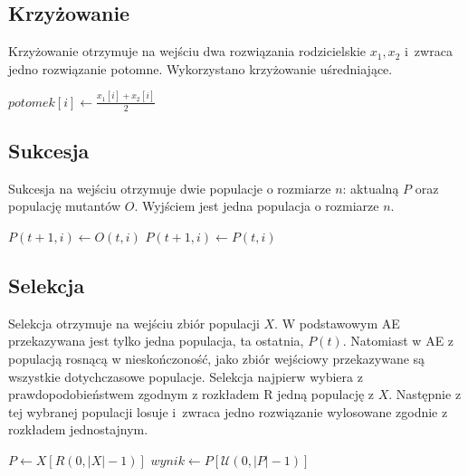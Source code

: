\documentclass[12pt, a4paper]{article}
\begin{document}
\subsection{Krzyżowanie}

Krzyżowanie otrzymuje na wejściu dwa rozwiązania rodzicielskie $x_1,x_2$ i~zwraca jedno rozwiązanie potomne. 
Wykorzystano krzyżowanie uśredniające.

\begin{algorithm}[!htb]
\begin{algorithmic}[1]
    \State $potomek[i] \gets \frac{x_1[i] + x_2[i]}{2}$
  \EndFor
\EndFunction
\end{algorithmic}
\end{algorithm}

\subsection{Sukcesja}

Sukcesja na wejściu otrzymuje dwie populacje o rozmiarze $n$: aktualną $P$ oraz populację mutantów $O$.
Wyjściem jest jedna populacja o rozmiarze $n$.

\begin{algorithm}[!htb]
\begin{algorithmic}[1]
      \State $P(t+1, i) \gets O(t, i)$
    \Else
      \State $P(t+1, i) \gets P(t, i)$
    \EndIf
  \EndFor
\EndFunction
\end{algorithmic}
\end{algorithm}

\subsection{Selekcja}

Selekcja otrzymuje na wejściu zbiór populacji $X$. W podstawowym AE przekazywana jest tylko jedna populacja, ta ostatnia, $P(t)$.
Natomiast w AE z populacją rosnącą w nieskończoność, jako zbiór wejściowy przekazywane są wszystkie dotychczasowe populacje.
Selekcja najpierw wybiera z prawdopodobieństwem zgodnym z rozkładem R jedną populację z $X$. Następnie z tej wybranej populacji 
losuje i~zwraca jedno rozwiązanie wylosowane zgodnie z rozkładem jednostajnym.

\begin{algorithm}[!htb]
\begin{algorithmic}[1]
  \State $P \gets X[R(0, |X| - 1)]$
  \State $wynik \gets P[\mathcal{U}(0, |P| - 1)]$
\EndFunction
\end{algorithmic}
\end{algorithm}
\end{document}
